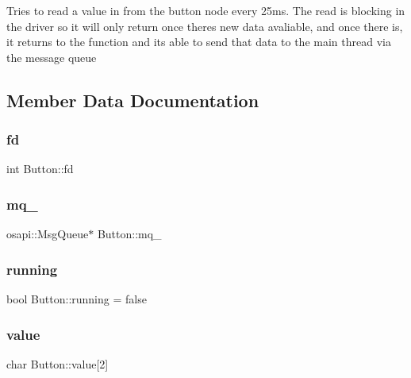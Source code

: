Tries to read a value in from the button node every 25ms. The read is blocking in the driver so it will only return once there\textquotesingle{}s new data avaliable, and once there is, it returns to the function and it\textquotesingle{}s able to send that data to the main thread via the message queue 

\subsection{Member Data Documentation}
\mbox{\label{class_button_ac044518f4ed7fc329e9d9e7cad6eb146}} 
\subsubsection{\texorpdfstring{fd}{fd}}
{\footnotesize\ttfamily int Button\+::fd\hspace{0.3cm}{\ttfamily [private]}}

\mbox{\label{class_button_a5e8e98a2391796121a464347d5df5de8}} 
\subsubsection{\texorpdfstring{mq\+\_\+}{mq\_}}
{\footnotesize\ttfamily osapi\+::\+Msg\+Queue$\ast$ Button\+::mq\+\_\+\hspace{0.3cm}{\ttfamily [private]}}

\mbox{\label{class_button_a705b1047e838e1a2c6d3a18c51a8c168}} 
\subsubsection{\texorpdfstring{running}{running}}
{\footnotesize\ttfamily bool Button\+::running = false\hspace{0.3cm}{\ttfamily [private]}}

\mbox{\label{class_button_a81aa56b14de245886c538ca18dfd1782}} 
\subsubsection{\texorpdfstring{value}{value}}
{\footnotesize\ttfamily char Button\+::value\mbox{[}2\mbox{]}\hspace{0.3cm}{\ttfamily [private]}}



